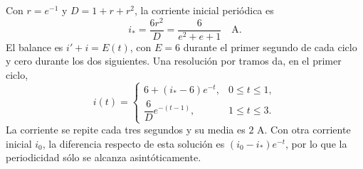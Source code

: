 Con \(r=e^{-1}\) y \(D=1+r+r^2\), la corriente inicial periódica es
\[
i_* =\frac{6r^2}{D}=\frac6{e^2+e+1}\quad\mathrm A.
\]
El balance es \(i'+i=E(t)\), con \(E=6\) durante el primer segundo de cada ciclo y cero durante los dos siguientes. Una resolución por tramos da, en el primer ciclo,
\[
i(t)=
\begin{cases}
6+(i_*-6)e^{-t},&0\le t\le1,\\
\dfrac6D e^{-(t-1)},&1\le t\le3.
\end{cases}
\]
La corriente se repite cada tres segundos y su media es \(2\) A. Con otra corriente inicial \(i_0\), la diferencia respecto de esta solución es \((i_0-i_*)e^{-t}\), por lo que la periodicidad sólo se alcanza asintóticamente.
